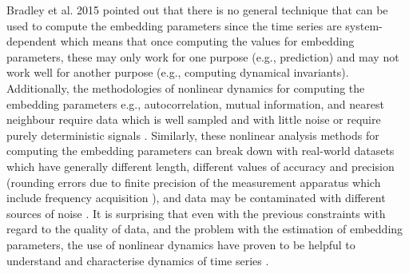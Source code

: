 \documentclass[fleqn,10pt]{wlscirep}
\begin{document}
Bradley et al. 2015 \cite{bradley2015} pointed out that
there is no general technique that can be used to compute the embedding
parameters since the time series are system-dependent which means that
once computing the values for embedding parameters, these may only work for
one purpose (e.g., prediction) and may not work well for another purpose
(e.g., computing dynamical invariants).
Additionally, the methodologies of nonlinear dynamics for 
computing the embedding parameters e.g., autocorrelation, mutual information, 
and nearest neighbour require data which is well 
sampled and with little noise \cite{garland2016}
or require purely deterministic signals \cite{kantz2003}.
Similarly, these nonlinear analysis methods for computing the embedding 
parameters can break down
with real-world datasets which have generally different length, 
different values of accuracy and precision (rounding errors due to finite 
precision of the measurement apparatus which include frequency 
acquisition \cite{frank2010}),
and data may be contaminated with different sources of noise
\cite{garland2016}.
It is surprising that even with the previous constraints with regard to 
the quality of data, and the problem with the estimation of embedding parameters,
the use of nonlinear dynamics have proven to be helpful to understand and 
characterise dynamics of time series 
\cite{Quintana-Duque2012, Quintana-Duque2016, sama2013, frank2010,
gomezgarcia2014, gomezgarcia2014, marwan2011, stergiou2011, bradley2015}.

\end{document}
